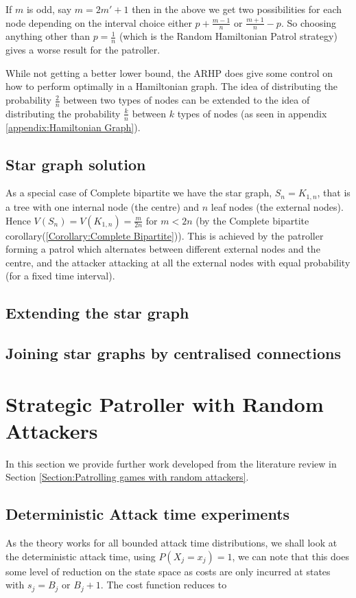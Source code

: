 \documentclass[a4paper,10pt]{article}
\theoremstyle{definition}
\theoremstyle{definition}
\theoremstyle{remark}
\theoremstyle{definition}
\begin{document}
If $m$ is odd, say $m=2m'+1$ then in the above we get two possibilities for each node depending on the interval choice either $p+\frac{m-1}{n}$ or $\frac{m+1}{n}-p$. So choosing anything other than $p=\frac{1}{n}$ (which is the Random Hamiltonian Patrol strategy) gives a worse result for the patroller.

While not getting a better lower bound, the ARHP does give some control on how to perform optimally in a Hamiltonian graph. The idea of distributing the probability $\frac{2}{n}$ between two types of nodes can be extended to the idea of distributing the probability $\frac{k}{n}$ between $k$ types of nodes (as seen in appendix \ref{appendix:Hamiltonian Graph}).
\subsection{Star graph solution}
As a special case of Complete bipartite we have the star graph, $S_{n}=K_{1,n}$, that is a tree with one internal node (the centre) and $n$ leaf nodes (the external nodes). Hence $V(S_{n})=V(K_{1,n})=\frac{m}{2n}$ for $m<2n$ (by the Complete bipartite corollary(\ref{Corollary:Complete Bipartite})). This is achieved by the patroller forming a patrol which alternates between different  external nodes and the centre, and the attacker attacking at all the external nodes with equal probability (for a fixed time interval).
\subsection{Extending the star graph}
\subsection{Joining star graphs by centralised connections}

\section{Strategic Patroller with Random Attackers}
In this section we provide further work developed from the literature review in Section \ref{Section:Patrolling games with random attackers}.

\subsection{Deterministic Attack time experiments}
As the theory  works for all bounded attack time distributions, we shall look at the deterministic attack time, using $P(X_{j}=x_{j})=1$, we can note that this does some level of reduction on the state space as costs are only incurred at states with $s_{j}=B_{j}$ or $B_{j}+1$. The cost function reduces to
\end{document}
